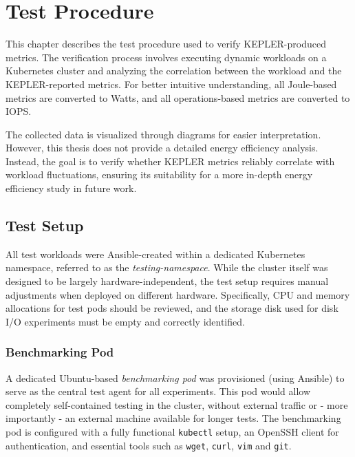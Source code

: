 
\chapter{Test Procedure} %
\label{Chapter4}

This chapter describes the test procedure used to verify KEPLER-produced metrics. The verification process involves executing dynamic workloads on a Kubernetes cluster and analyzing the correlation between the workload and the KEPLER-reported metrics. For better intuitive understanding, all Joule-based metrics are converted to Watts, and all operations-based metrics are converted to IOPS.

The collected data is visualized through diagrams for easier interpretation. However, this thesis does not provide a detailed energy efficiency analysis. Instead, the goal is to verify whether KEPLER metrics reliably correlate with workload fluctuations, ensuring its suitability for a more in-depth energy efficiency study in future work.

\section{Test Setup}
All test workloads were Ansible-created within a dedicated Kubernetes namespace, referred to as the \textit{testing-namespace}. While the cluster itself was designed to be largely hardware-independent, the test setup requires manual adjustments when deployed on different hardware. Specifically, CPU and memory allocations for test pods should be reviewed, and the storage disk used for disk I/O experiments must be empty and correctly identified.

\subsection{Benchmarking Pod}
A dedicated Ubuntu-based \textit{benchmarking pod} was provisioned (using Ansible) to serve as the central test agent for all experiments. This pod would allow completely self-contained testing in the cluster, without external traffic or - more importantly - an external machine available for longer tests. The benchmarking pod is configured with a fully functional \texttt{kubectl} setup, an OpenSSH client for authentication, and essential tools such as \texttt{wget}, \texttt{curl}, \texttt{vim} and \texttt{git}.


